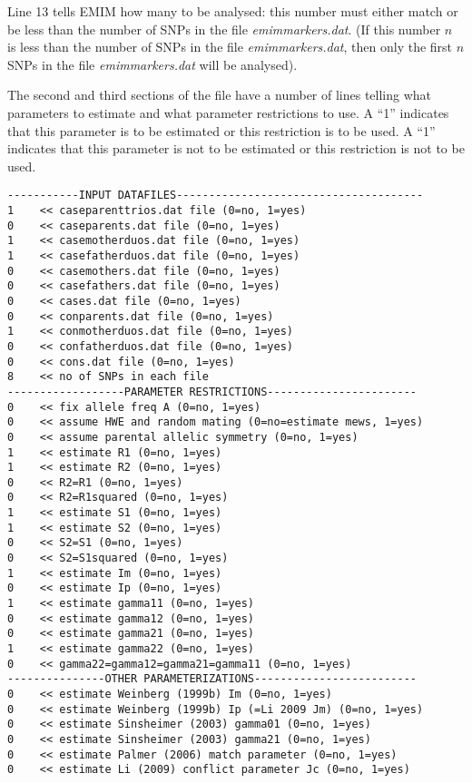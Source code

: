\documentclass[a4paper,11pt]{report}
\begin{document}
Line 13 tells EMIM how many to be analysed: this number must either match or be less than the number of SNPs in the file  {\it emimmarkers.dat}. (If this number $n$ is less than  the number of SNPs in the file  {\it emimmarkers.dat}, then only the first $n$ SNPs  in the file  {\it emimmarkers.dat} will be analysed).

The second and third sections of the file have 
a number of lines telling what parameters to estimate and what parameter restrictions to use. A ``1'' indicates that this
parameter is to be estimated or this restriction is to be used. 
A ``1'' indicates that this
parameter is not to be estimated or this restriction is not to be used.



\newpage
\begin{verbatim}
-----------INPUT DATAFILES--------------------------------------
1    << caseparenttrios.dat file (0=no, 1=yes)
0    << caseparents.dat file (0=no, 1=yes)
1    << casemotherduos.dat file (0=no, 1=yes)
1    << casefatherduos.dat file (0=no, 1=yes)
0    << casemothers.dat file (0=no, 1=yes)
0    << casefathers.dat file (0=no, 1=yes)
0    << cases.dat file (0=no, 1=yes)
0    << conparents.dat file (0=no, 1=yes)
1    << conmotherduos.dat file (0=no, 1=yes)
0    << confatherduos.dat file (0=no, 1=yes)
0    << cons.dat file (0=no, 1=yes)
8    << no of SNPs in each file
------------------PARAMETER RESTRICTIONS-----------------------
0    << fix allele freq A (0=no, 1=yes)
0    << assume HWE and random mating (0=no=estimate mews, 1=yes)
0    << assume parental allelic symmetry (0=no, 1=yes)
1    << estimate R1 (0=no, 1=yes)
1    << estimate R2 (0=no, 1=yes)
0    << R2=R1 (0=no, 1=yes)
0    << R2=R1squared (0=no, 1=yes)
1    << estimate S1 (0=no, 1=yes)    
1    << estimate S2 (0=no, 1=yes)
0    << S2=S1 (0=no, 1=yes)
0    << S2=S1squared (0=no, 1=yes)
1    << estimate Im (0=no, 1=yes)
0    << estimate Ip (0=no, 1=yes)
1    << estimate gamma11 (0=no, 1=yes)
0    << estimate gamma12 (0=no, 1=yes)
0    << estimate gamma21 (0=no, 1=yes)
1    << estimate gamma22 (0=no, 1=yes)
0    << gamma22=gamma12=gamma21=gamma11 (0=no, 1=yes)
---------------OTHER PARAMETERIZATIONS-------------------------
0    << estimate Weinberg (1999b) Im (0=no, 1=yes)
0    << estimate Weinberg (1999b) Ip (=Li 2009 Jm) (0=no, 1=yes)
0    << estimate Sinsheimer (2003) gamma01 (0=no, 1=yes)
0    << estimate Sinsheimer (2003) gamma21 (0=no, 1=yes)
0    << estimate Palmer (2006) match parameter (0=no, 1=yes)
0    << estimate Li (2009) conflict parameter Jc (0=no, 1=yes)
\end{verbatim}
\end{document}

